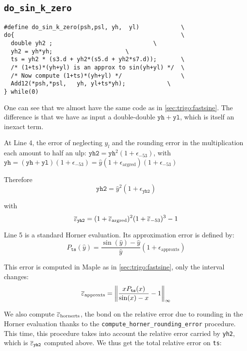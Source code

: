 \subsection{\texttt{do\_sin\_k\_zero}}


\begin{lstlisting}[caption={do\_sin\_k\_zero},firstnumber=1]
#define do_sin_k_zero(psh,psl, yh,  yl)            \
do{                                                \
  double yh2 ;	              			   \
  yh2 = yh*yh;					   \
  ts = yh2 * (s3.d + yh2*(s5.d + yh2*s7.d));	   \
  /* (1+ts)*(yh+yl) is an approx to sin(yh+yl) */  \
  /* Now compute (1+ts)*(yh+yl) */                 \
  Add12(*psh,*psl,   yh, yl+ts*yh);	           \
} while(0)						   
\end{lstlisting}

One can see that we almost have the same code as in
\ref{sec:trigo:fastsine}. The difference is that we have as input
a double-double $\mathtt{yh}+\mathtt{yl}$, which is itself an inexact term. 

At Line 4, the error of neglecting $y_l$ and the rounding error in the
multiplication each amount to half an ulp:
  $\mathtt{yh2}=\mathtt{yh}^2(1+\epsilon_{-53})$, 
 with $\mathtt{yh} = (\mathtt{yh}+\mathtt{yl})(1+\epsilon_{-53}) = \hat{y}(1+\epsilon_{\mathrm{argred}})(1+\epsilon_{-53})$

Therefore
\begin{equation}
  \mathtt{yh2}=\hat{y}^2(1+\epsilon_{\mathtt{yh2}})
\end{equation}

with
\begin{equation}
  {\overline{\varepsilon}}_{\mathtt{yh2}} = (1+{\overline{\varepsilon}}_{\mathrm{argred}})^2(1+{\overline{\varepsilon}}_{-53})^3 - 1
\end{equation}

Line 5 is a standard Horner evaluation. Its approximation error is defined by: 
$$
P_{\mathtt{ts}}(\hat{y}) = \frac{\sin(\hat{y})-\hat{y}}{\hat{y}}(1+\epsilon_{\mathrm{approxts}})
$$

This error is computed in Maple as in \ref{sec:trigo:fastsine}, only the interval changes:
$${\overline{\varepsilon}}_{\mathrm{approxts}} = \left\Vert \frac{xP_{\mathtt{ts}}(x)}{\sin(x)-x} -1 \right\Vert_{\infty}$$

We also compute ${\overline{\varepsilon}}_{\mathrm{hornerts}}$, the bond on the relative error due
to rounding in the Horner evaluation thanks to the
\texttt{compute\_horner\_rounding\_error} procedure. This time, this procedure 
takes into account the relative error carried by \texttt{yh2}, which is
${\overline{\varepsilon}}_{\mathtt{yh2}}$ computed above.
We thus get the total relative error on \texttt{ts}:

